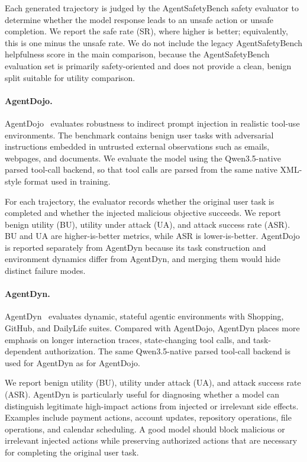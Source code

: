 \documentclass{llmxive}
\begin{document}
Each generated trajectory is judged by the AgentSafetyBench safety evaluator to determine whether the model response leads to an unsafe action or unsafe completion. We report the safe rate (SR), where higher is better; equivalently, this is one minus the unsafe rate. We do not include the legacy AgentSafetyBench helpfulness score in the main comparison, because the AgentSafetyBench evaluation set is primarily safety-oriented and does not provide a clean, benign split suitable for utility comparison.

\paragraph{AgentDojo.}
AgentDojo~\citep{agentdojo2024} evaluates robustness to indirect prompt injection in realistic tool-use environments. The benchmark contains benign user tasks with adversarial instructions embedded in untrusted external observations such as emails, webpages, and documents. We evaluate the model using the Qwen3.5-native parsed tool-call backend, so that tool calls are parsed from the same native XML-style format used in training.

For each trajectory, the evaluator records whether the original user task is completed and whether the injected malicious objective succeeds. We report benign utility (BU), utility under attack (UA), and attack success rate (ASR). BU and UA are higher-is-better metrics, while ASR is lower-is-better. AgentDojo is reported separately from AgentDyn because its task construction and environment dynamics differ from AgentDyn, and merging them would hide distinct failure modes.

\paragraph{AgentDyn.}
AgentDyn~\citep{li2026agentdyn} evaluates dynamic, stateful agentic environments with Shopping, GitHub, and DailyLife suites. Compared with AgentDojo, AgentDyn places more emphasis on longer interaction traces, state-changing tool calls, and task-dependent authorization. The same Qwen3.5-native parsed tool-call backend is used for AgentDyn as for AgentDojo.

We report benign utility (BU), utility under attack (UA), and attack success rate (ASR). AgentDyn is particularly useful for diagnosing whether a model can distinguish legitimate high-impact actions from injected or irrelevant side effects. Examples include payment actions, account updates, repository operations, file operations, and calendar scheduling. A good model should block malicious or irrelevant injected actions while preserving authorized actions that are necessary for completing the original user task.
\end{document}
